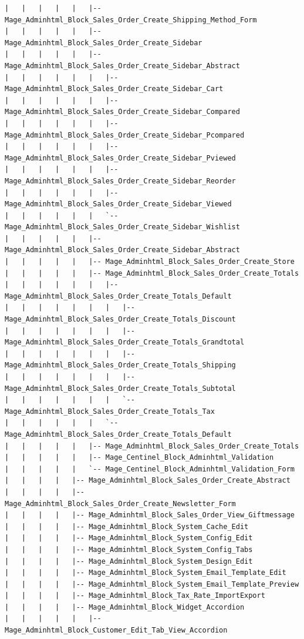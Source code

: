 \documentclass[oneside]{book}
\begin{document}
\begin{lstlisting}
|   |   |   |   |   |-- Mage_Adminhtml_Block_Sales_Order_Create_Shipping_Method_Form
|   |   |   |   |   |-- Mage_Adminhtml_Block_Sales_Order_Create_Sidebar
|   |   |   |   |   |-- Mage_Adminhtml_Block_Sales_Order_Create_Sidebar_Abstract
|   |   |   |   |   |   |-- Mage_Adminhtml_Block_Sales_Order_Create_Sidebar_Cart
|   |   |   |   |   |   |-- Mage_Adminhtml_Block_Sales_Order_Create_Sidebar_Compared
|   |   |   |   |   |   |-- Mage_Adminhtml_Block_Sales_Order_Create_Sidebar_Pcompared
|   |   |   |   |   |   |-- Mage_Adminhtml_Block_Sales_Order_Create_Sidebar_Pviewed
|   |   |   |   |   |   |-- Mage_Adminhtml_Block_Sales_Order_Create_Sidebar_Reorder
|   |   |   |   |   |   |-- Mage_Adminhtml_Block_Sales_Order_Create_Sidebar_Viewed
|   |   |   |   |   |   `-- Mage_Adminhtml_Block_Sales_Order_Create_Sidebar_Wishlist
|   |   |   |   |   |-- Mage_Adminhtml_Block_Sales_Order_Create_Sidebar_Abstract
|   |   |   |   |   |-- Mage_Adminhtml_Block_Sales_Order_Create_Store
|   |   |   |   |   |-- Mage_Adminhtml_Block_Sales_Order_Create_Totals
|   |   |   |   |   |   |-- Mage_Adminhtml_Block_Sales_Order_Create_Totals_Default
|   |   |   |   |   |   |   |-- Mage_Adminhtml_Block_Sales_Order_Create_Totals_Discount
|   |   |   |   |   |   |   |-- Mage_Adminhtml_Block_Sales_Order_Create_Totals_Grandtotal
|   |   |   |   |   |   |   |-- Mage_Adminhtml_Block_Sales_Order_Create_Totals_Shipping
|   |   |   |   |   |   |   |-- Mage_Adminhtml_Block_Sales_Order_Create_Totals_Subtotal
|   |   |   |   |   |   |   `-- Mage_Adminhtml_Block_Sales_Order_Create_Totals_Tax
|   |   |   |   |   |   `-- Mage_Adminhtml_Block_Sales_Order_Create_Totals_Default
|   |   |   |   |   |-- Mage_Adminhtml_Block_Sales_Order_Create_Totals
|   |   |   |   |   |-- Mage_Centinel_Block_Adminhtml_Validation
|   |   |   |   |   `-- Mage_Centinel_Block_Adminhtml_Validation_Form
|   |   |   |   |-- Mage_Adminhtml_Block_Sales_Order_Create_Abstract
|   |   |   |   |-- Mage_Adminhtml_Block_Sales_Order_Create_Newsletter_Form
|   |   |   |   |-- Mage_Adminhtml_Block_Sales_Order_View_Giftmessage
|   |   |   |   |-- Mage_Adminhtml_Block_System_Cache_Edit
|   |   |   |   |-- Mage_Adminhtml_Block_System_Config_Edit
|   |   |   |   |-- Mage_Adminhtml_Block_System_Config_Tabs
|   |   |   |   |-- Mage_Adminhtml_Block_System_Design_Edit
|   |   |   |   |-- Mage_Adminhtml_Block_System_Email_Template_Edit
|   |   |   |   |-- Mage_Adminhtml_Block_System_Email_Template_Preview
|   |   |   |   |-- Mage_Adminhtml_Block_Tax_Rate_ImportExport
|   |   |   |   |-- Mage_Adminhtml_Block_Widget_Accordion
|   |   |   |   |   |-- Mage_Adminhtml_Block_Customer_Edit_Tab_View_Accordion

\end{lstlisting}
\end{document}
